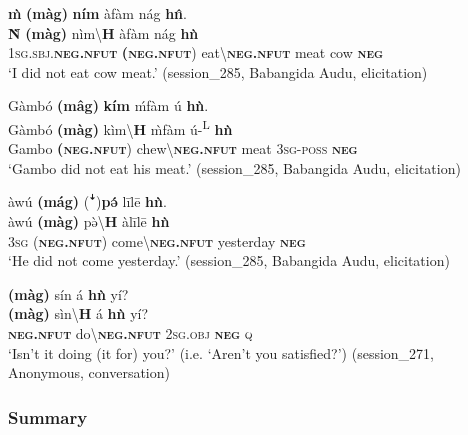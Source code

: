 \documentclass[output=paper,colorlinks,citecolor=brown]{langscibook}
\begin{document}
\ea\label{ex:kam:29} 
    \glll \textbf{\`{m}} \textbf{(màg)} \textbf{ním} àfàm nág \textbf{h\^{n}}.\\
        \textbf{\`{N}} \textbf{(màg)} nìm{\textbackslash}\textbf{H} àfàm nág \textbf{hǹ}\\
        \textsc{1sg}.\textsc{sbj}.\textbf{\textsc{neg}}\textbf{.\textsc{nfut}} \textbf{(\textsc{neg}}\textbf{.\textsc{nfut}}) eat{\textbackslash}\textbf{\textsc{neg}}\textbf{.\textsc{nfut}} meat cow \textbf{\textsc{neg}}\\
    \glt ‘I did not eat cow meat.’ (session\_285, Babangida Audu, elicitation)
\z 

\ea\label{ex:kam:30} 
    \glll Gàmbó \textbf{(mâg)} \textbf{kím} ḿfàm ú \textbf{hǹ}.\\
        Gàmbó \textbf{(màg)} kìm{\textbackslash}\textbf{H} \`{m}fàm ú-\textsuperscript{L} \textbf{hǹ}\\
        Gambo \textbf{(\textsc{neg}}\textbf{.\textsc{nfut}}) chew{\textbackslash}\textbf{\textsc{neg}}\textbf{.\textsc{nfut}} meat \textsc{3sg-poss} \textbf{\textsc{neg}}\\
    \glt ‘Gambo did not eat his meat.’ (session\_285, Babangida Audu, elicitation)
\z 

\ea\label{ex:kam:31} 
    \glll àwú \textbf{(mág)} (ꜜ)\textbf{pə́} līlē \textbf{hǹ}.\\
        àwú \textbf{(màg)} pə̀{\textbackslash}\textbf{H} àlīlē \textbf{hǹ}\\
        \textsc{3sg} (\textbf{\textsc{neg}}\textbf{.\textsc{nfut}}) come{\textbackslash}\textbf{\textsc{neg}}\textbf{.\textsc{nfut}} yesterday \textbf{\textsc{neg}}\\
    \glt ‘He did not come yesterday.’ (session\_285, Babangida Audu, elicitation)
\z 

\ea\label{ex:kam:32}
    \glll \textbf{(màg)} sín á \textbf{hǹ} yí?\\
        \textbf{(màg)} sìn{\textbackslash}\textbf{H} á \textbf{hǹ} yí?\\
        \textbf{\textsc{neg}}\textbf{.\textsc{nfut}} do{\textbackslash}\textbf{\textsc{neg}}\textbf{.\textsc{nfut}} 2\textsc{sg.obj} \textbf{\textsc{neg}} \textsc{q}\\
    \glt ‘Isn’t it doing (it for) you?’ (i.e. ‘Aren’t you satisfied?’) (session\_271, Anonymous, conversation) 
\z 
\subsubsection{Summary}\label{sec:kam:2.1.4}
\end{document}
